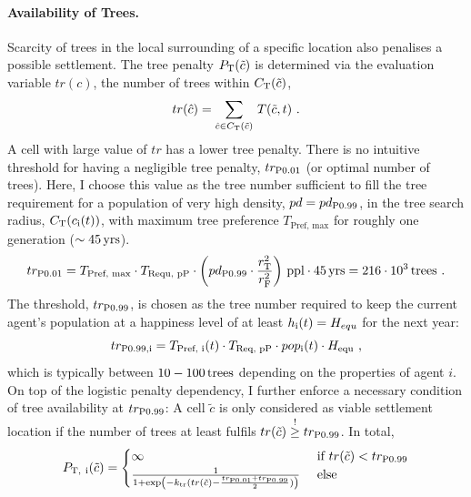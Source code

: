 \paragraph{Availability of Trees.} %
Scarcity of trees in the local surrounding of a specific location also penalises a possible settlement.
The tree penalty $P_{\rm T}(\tilde{c})$ is determined via the evaluation variable $tr(c)$, the number of trees within $C_{\rm T}(\tilde{c})$,
\begin{equation}
	tr(\hat{c}) = \sum_{\hat{c} \in C_{\rm T}(\tilde{c})}\, T(\tilde{c},t) \ .
\end{equation}
A cell with large value of $tr$ has a lower tree penalty.
There is no intuitive threshold for having a negligible tree penalty, $tr_{\rm P0.01}$ (or optimal number of trees).
Here, I choose this value as the tree number sufficient to fill the tree requirement for a population of very high density, $pd = pd_{\rm P0.99}$, in the tree search radius, $C_{\rm T}(c_{\rm i}(t))$, with maximum tree preference $T_\text{Pref, max}$ for roughly one generation ($\sim 45\, {\rm yrs}$).
\begin{equation}
tr_{\rm P0.01} = T_\text{Pref, max} \cdot T_\text{Requ, pP} \cdot \left(pd_{\rm P0.99} \cdot \frac{r_{\rm T}^2}{r_{\rm F}^{2}}\right) \, {\rm ppl} \cdot 45\, {\rm yrs} = 
216\cdot 10^3 \, {\rm trees} \ .
\end{equation} 
The threshold, $tr_{\rm P0.99}$, is chosen as the tree number required to keep the current agent's population at a happiness level of at least $h_{\rm i}(t) = H_{equ}$ for the next year:
\begin{equation}
tr_{\rm P0.99, i}= T_\text{Pref, i}(t) \cdot T_\text{Req, pP} \cdot pop_{\rm i}(t) \cdot H_\text{equ} \ ,
\end{equation}
which is typically between $10-100\, {\rm trees}$ depending on the properties of agent $i$.
On top of the logistic penalty dependency, I further enforce a necessary condition of tree availability at $tr_{\rm P0.99}$: 
A cell $\tilde{c}$ is only considered as viable settlement location if the number of trees at least fulfils $tr(\tilde{c}) \stackrel{!}{\geq} tr_{\rm P0.99}$. 
In total, 
\begin{equation}
P_{\rm T, \ i}(\tilde{c}) = 
\begin{cases} \infty & \text{ if }tr(\tilde{c})< tr_{\rm P0.99} \\
\frac{1}{1+\exp\left( - k_{\rm tr} (tr(\tilde{c})-\frac{tr_{\rm P0.01}+tr_{\rm P0.99}}{2}) \right)} & \text{ else }
\end{cases}
\end{equation}


